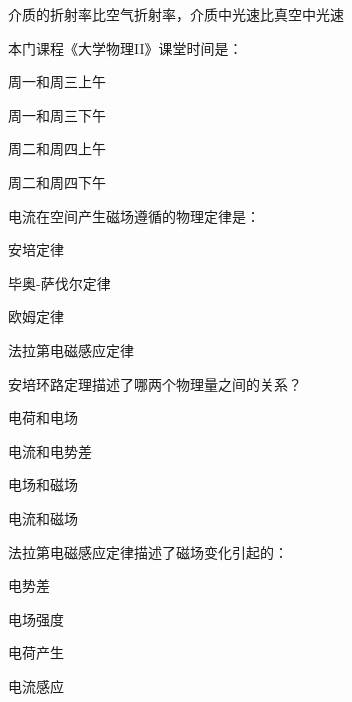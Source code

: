 \documentclass{njustexam}
\begin{document}
\begin{problem}
介质的折射率比空气折射率，介质中光速比真空中光速
\end{problem}



\begin{problem}

  本门课程《大学物理II》课堂时间是：
  \begin{abcd}
    \item 周一和周三上午
    \item 周一和周三下午
    \item 周二和周四上午
    \item 周二和周四下午
  \end{abcd}
\end{problem} 

\begin{problem}

  电流在空间产生磁场遵循的物理定律是：
  \begin{abcd}
    \item 安培定律
    \item 毕奥-萨伐尔定律
    \item 欧姆定律
    \item 法拉第电磁感应定律
  \end{abcd}
  \end{problem} 

\begin{problem}

  安培环路定理描述了哪两个物理量之间的关系？
  \begin{abcd}
\item 电荷和电场
\item 电流和电势差
\item 电场和磁场
\item 电流和磁场
  \end{abcd}
  \end{problem}

  \begin{problem}

    法拉第电磁感应定律描述了磁场变化引起的：
    \begin{abcd}
      \item 电势差
      \item 电场强度
      \item 电荷产生
      \item 电流感应
    \end{abcd}
    \end{problem}
\end{document}
